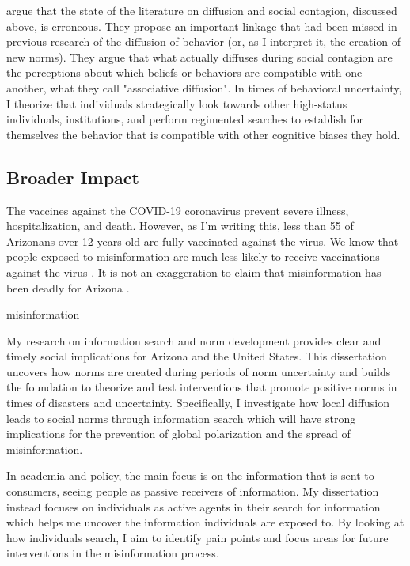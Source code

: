 \citet{goldbergSocialContagionAssociative2018} argue that the state of the literature on
diffusion and social contagion, discussed above, is erroneous. They
propose an important linkage that had been missed in previous research
of the diffusion of behavior (or, as I interpret it, the creation of new
norms). They argue that what actually diffuses during social contagion
are the perceptions about which beliefs or behaviors are compatible with
one another, what they call "associative diffusion". In times of
behavioral uncertainty, I theorize that individuals strategically look
towards other high-status individuals, institutions, and perform
regimented searches to establish for themselves the behavior that is
compatible with other cognitive biases they hold.

\subsection{Broader Impact}


The vaccines against the COVID-19 coronavirus prevent severe illness,
hospitalization, and death. However, as I'm writing this, less than 55%
of Arizonans over 12 years old are fully vaccinated against the virus.
We know that people exposed to misinformation are much less likely to
receive vaccinations against the virus \citep{loombaMeasuringImpactCOVID192021}. It is not
an exaggeration to claim that misinformation has been deadly for Arizona
\citep{pathakInfodemicsCOVID19Role2020}.

misinformation \citep{greene_murphy21}

My research on information search and norm development provides clear
and timely social implications for Arizona and the United States. This
dissertation uncovers how norms are created during periods of norm
uncertainty and builds the foundation to theorize and test interventions
that promote positive norms in times of disasters and uncertainty.
Specifically, I investigate how local diffusion leads to social norms
through information search which will have strong implications for the
prevention of global polarization and the spread of misinformation.

In academia and policy, the main focus is on the information that is
sent to consumers, seeing people as passive receivers of information. My dissertation instead
focuses on individuals as active agents in their search for information
which helps me uncover the information individuals are exposed to. By
looking at how individuals search, I aim to identify pain points and focus areas for
future interventions in the misinformation process.


